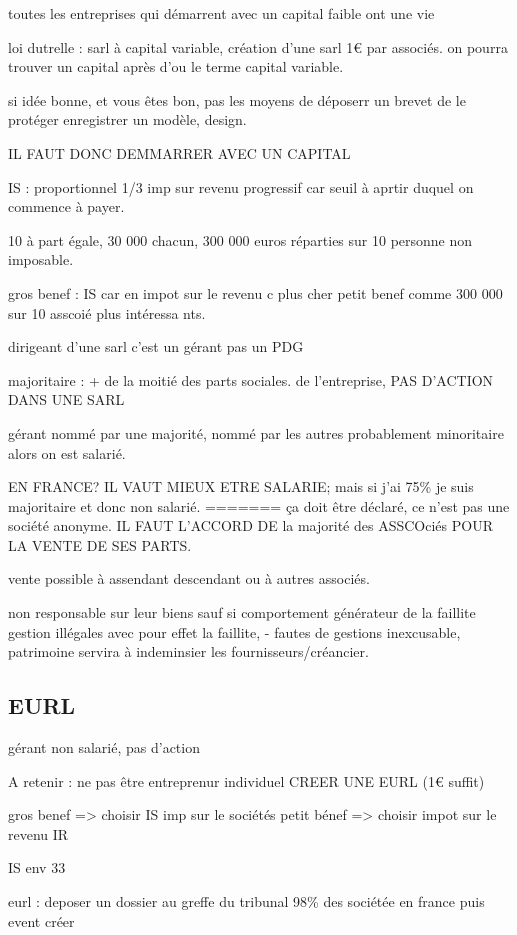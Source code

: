 \documentclass[a4paper,12pt]{article}
\begin{document}
toutes les entreprises qui démarrent avec un capital faible ont une vie

loi dutrelle : sarl à capital variable, création d'une sarl 1€ par associés.
on pourra trouver un capital après d'ou le terme capital variable.


si idée bonne, et vous êtes bon, pas les moyens de déposerr un brevet de le protéger
enregistrer un modèle, design.

IL FAUT DONC DEMMARRER AVEC UN CAPITAL

IS : proportionnel 1/3
imp sur revenu progressif car seuil à aprtir duquel on commence à payer.

10 à part égale, 30 000 chacun, 300 000 euros réparties sur 10 personne non imposable.

gros benef : IS car en impot sur le revenu c plus cher
petit benef comme 300 000 sur 10 asscoié plus intéressa	nts.

dirigeant d'une sarl c'est un gérant pas un PDG

majoritaire : + de la moitié des parts sociales. de l'entreprise, PAS D'ACTION DANS UNE SARL

gérant nommé par une majorité, nommé par les autres probablement minoritaire alors
on est salarié.

EN FRANCE? IL VAUT MIEUX ETRE SALARIE;
mais si j'ai 75\% je suis majoritaire et donc non salarié.
=======
ça doit être déclaré, ce n'est pas une société anonyme.
IL FAUT L'ACCORD DE la majorité des ASSCOciés POUR LA VENTE DE SES PARTS.

vente possible à assendant descendant ou à autres associés.

non responsable sur leur biens sauf si comportement générateur de la faillite
gestion illégales avec pour effet la faillite, 
- fautes de gestions inexcusable,
patrimoine servira à indeminsier les fournisseurs/créancier.

\subsection{EURL}
gérant non salarié, pas d'action

A retenir : ne pas être entreprenur individuel CREER UNE EURL  (1€ suffit)

gros benef => choisir IS imp sur le sociétés
petit bénef => choisir impot sur le revenu IR

IS env 33%

eurl : deposer un dossier au greffe du tribunal
98\% des sociétée en france
puis event créer
\end{document}
